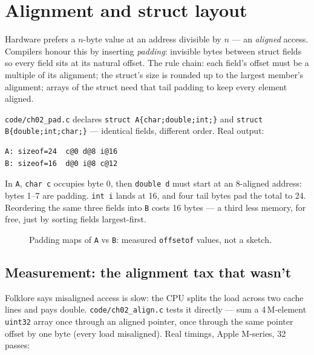 \section{Alignment and struct layout}
\label{sec:align02}

Hardware prefers a $n$-byte value at an address divisible by $n$ ---
an \emph{aligned} access. Compilers honour this by inserting
\emph{padding}: invisible bytes between struct fields so every field
sits at its natural offset. The rule chain: each field's offset must be
a multiple of its alignment; the struct's size is rounded up to the
largest member's alignment; arrays of the struct need that tail padding
to keep every element aligned.

\begin{example}
\label{ex:pad02}
\texttt{code/ch02\_pad.c} declares \texttt{struct A\{char;double;int;\}}
and \texttt{struct B\{double;int;char;\}} --- identical fields, different
order. Real output:

\begin{lstlisting}[basicstyle=\ttfamily\scriptsize]
A: sizeof=24  c@0 d@8 i@16
B: sizeof=16  d@0 i@8 c@12
\end{lstlisting}

In \texttt{A}, \texttt{char c} occupies byte 0, then \texttt{double d}
must start at an 8-aligned address: bytes 1--7 are padding. \texttt{int i}
lands at 16, and four tail bytes pad the total to 24. Reordering the
same three fields into \texttt{B} costs 16 bytes --- a third less
memory, for free, just by sorting fields largest-first.
\end{example}

\begin{figure}[htbp]
\centering

\caption{Padding maps of \texttt{A} vs \texttt{B}: measured
\texttt{offsetof} values, not a sketch.}
\label{fig:padding02}
\end{figure}

\subsection{Measurement: the alignment tax that wasn't}
\label{sec:measure02}

Folklore says misaligned access is slow: the CPU splits the load across
two cache lines and pays double. \texttt{code/ch02\_align.c} tests it
directly --- sum a 4\,M-element \texttt{uint32} array once through an
aligned pointer, once through the same pointer offset by one byte
(every load misaligned). Real timings, Apple M-series, 32 passes:

